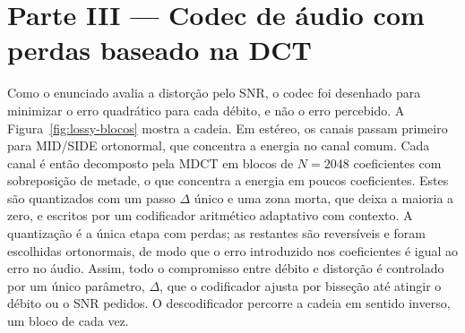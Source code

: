 \documentclass[a4paper,11pt]{article}
\begin{document}
\section{Parte III --- Codec de áudio com perdas baseado na DCT}
\label{sec:parte3}
Como o enunciado avalia a distorção pelo SNR, o codec foi desenhado para
minimizar o erro quadrático para cada débito, e não o erro percebido. A
Figura~\ref{fig:lossy-blocos} mostra a cadeia. Em estéreo, os canais passam
primeiro para MID/SIDE ortonormal, que concentra a energia no canal comum.
Cada canal é então decomposto pela MDCT em blocos de $N = 2048$ coeficientes
com sobreposição de metade, o que concentra a energia em poucos coeficientes.
Estes são quantizados com um passo $\Delta$ único e uma zona morta, que deixa a
maioria a zero, e escritos por um codificador aritmético adaptativo com
contexto. A quantização é a única etapa com perdas; as restantes são
reversíveis e foram escolhidas ortonormais, de modo que o erro introduzido nos
coeficientes é igual ao erro no áudio. Assim, todo o compromisso entre débito
e distorção é controlado por um único parâmetro, $\Delta$, que o codificador
ajusta por bisseção até atingir o débito ou o SNR pedidos. O descodificador
percorre a cadeia em sentido inverso, um bloco de cada vez.
\end{document}
